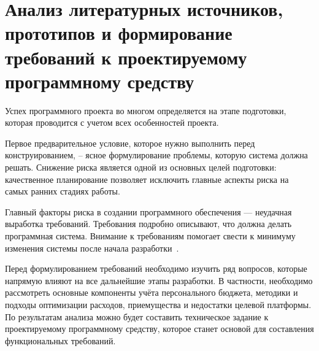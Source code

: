 \section{Анализ литературных источников, прототипов и формирование требований к проектируемому программному средству}
\label{sec:analysis}

Успех программного проекта во многом определяется на этапе подготовки, которая проводится с учетом всех особенностей проекта.

Первое предварительное условие, которое нужно выполнить перед конструированием, -- ясное формулирование проблемы, которую система должна решать.
Снижение риска является одной из основных целей подготовки: качественное планирование позволяет исключить главные аспекты риска на самых ранних стадиях работы.

Главный факторы риска в создании программного обеспечения — неудачная выработка требований.
Требования подробно описывают, что должна делать программная система.
Внимание к требованиям помогает свести к минимуму изменения системы после начала разработки~\cite{code_complete}.

Перед формулированием требований необходимо изучить ряд вопросов, которые напрямую влияют на все дальнейшие этапы разработки.
В частности, необходимо рассмотреть основные компоненты учёта персонального бюджета, методики и подходы оптимизации расходов, приемущества и недостатки целевой платформы.
По результатам анализа можно будет составить техническое задание к проектируемому программному средству, которое станет основой для составления функциональных требований.







